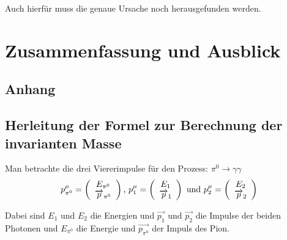 \documentclass[a4paper,11pt,oneside,final,german,openbib,pdftex]{scrbook}
\begin{document}
{Auch hierf\"ur muss die genaue Ursache noch herausgefunden werden.


\chapter{Zusammenfassung und Ausblick}


\begin{appendix}
\chapter{Anhang}
\section{Herleitung der Formel zur Berechnung der invarianten Masse}
\label{sec:Herleitung-der-Formel-zur-Berechnung-der-invarianten-Masse}

Man betrachte die drei Viererimpulse f\"ur den Prozess: $\pi^0\rightarrow \gamma\gamma $
\begin{equation}
p_{\pi^0}^{\mu}=\left(\begin{array}{c}E_{\pi^0}\\\overrightarrow{p}_{\pi^0}\end{array}\right) \textnormal{,  }
p_{1}^{\mu}=\left(\begin{array}{c}E_{1}\\\overrightarrow{p}_{1}\end{array}\right) \textnormal{ und  } p_{2}^{\mu}=\left(\begin{array}{c}E_{2}\\\overrightarrow{p}_{2}\end{array}\right)
\end{equation}

Dabei sind $E_{1}$ und $E_{2}$ die Energien und $\overrightarrow{p_{1}}$ und $\overrightarrow{p_{2}}$ die Impulse der beiden Photonen und $E_{\pi^0}$ die Energie und $\overrightarrow{p_{\pi^0}}$ der Impuls des Pion.


\end{appendix}}
\end{document}
